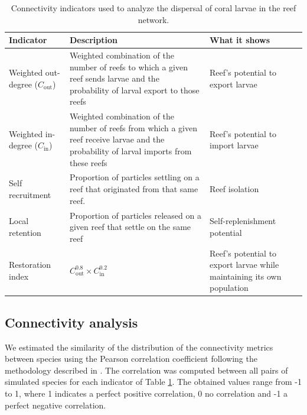 \documentclass[preprint,12pt,authoryear]{elsarticle}
\begin{document}
\begin{table}
    \begin{adjustwidth}{-1in}{-1in}
    \centering
    \small
    \begin{tabular}{p{}p{}p{}}
        \hline
        \textbf{Indicator} & \textbf{Description} & \textbf{What it shows} \\
        \hline
        Weighted out-degree ($C_\text{out}$) & Weighted combination of the number of reefs to which a given reef sends larvae and the probability of larval export to those reefs & Reef's potential to export larvae \\
        Weighted in-degree ($C_\text{in}$) & Weighted combination of the number of reefs from which a given reef receive larvae and the probability of larval imports from these reefs & Reef's potential to import larvae \\
        Self recruitment & Proportion of particles settling on a reef that originated from that same reef. & Reef isolation \\
        Local retention & Proportion of particles released on a given reef that settle on the same reef & Self-replenishment potential \\
        Restoration index & $C_\text{out}^{0.8} \times C_\text{in}^{0.2}$ & Reef's potential to export larvae while maintaining its own population \\
        \hline
    \end{tabular}
    \end{adjustwidth}
    \caption{Connectivity indicators used to analyze the dispersal of coral larvae in the reef network.}\label{tab:indicators}
\end{table}

\subsection*{Connectivity analysis}

We estimated the similarity of the distribution of the connectivity metrics between species using the Pearson correlation coefficient following the methodology described in \cite{boccaletti2014structure}. The correlation was computed between all pairs of simulated species for each indicator of Table \ref{tab:indicators}. The obtained values range from -1 to 1, where 1 indicates a perfect positive correlation, 0 no correlation and -1 a perfect negative correlation.
\end{document}

